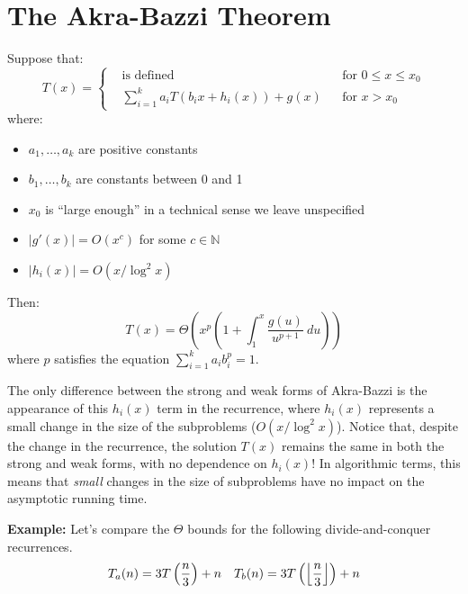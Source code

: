 \documentclass[12pt]{article}
\providecommand{\abs}[1]{\lvert#1\rvert}
\begin{document}



\section*{The Akra-Bazzi Theorem}

\begin{theorem}
Suppose that:
\[
T(x) =
\left\{
\begin{aligned}
& \text{is defined} && \text{for $0 \leq x \leq x_0$} \\
& {\displaystyle \sum_{i=1}^k a_i T(b_i x + h_i(x)) + g(x)} && \text{for $x > x_0$}
\end{aligned}
\right.
\]
%
where:
%
\begin{itemize}
\item $a_1, \dots, a_k$ are positive constants
\item $b_1, \dots, b_k$ are constants between 0 and 1
\item $x_0$ is ``large enough'' in a technical sense we leave unspecified
\item $\abs{g'(x)} = O(x^c)$ for some $c \in \mathbb{N}$
\item $\abs{h_i(x)} = O(x / \log^2 x)$
\end{itemize}
%
Then:
%
\[
T(x) = \Theta\left(x^p \left(1 + \int_1^x \frac{g(u)}{u^{p+1}} \ du\right)\right)
\]
%
where $p$ satisfies the equation $\sum_{i=1}^k a_i b_i^p = 1$.
\end{theorem}

The only difference between the strong and weak forms of Akra-Bazzi is the appearance of this $h_i(x)$ term in the recurrence, where $h_i(x)$ represents a small change in the size of the subproblems ($O(x / \log^2 x)$). Notice that, despite the change in the recurrence, the solution $T(x)$ remains the same in both the strong and weak forms, with no dependence on $h_i(x)$! In algorithmic terms, this means that \textit{small} changes in the size of subproblems have no
impact on the asymptotic running time.

\vspace{0.2in}

\noindent \textbf{Example:} Let's compare the $\Theta$ bounds for the following divide-and-conquer recurrences.
\begin{align*}
T_a(n) = 3T\left(\frac{n}{3}\right) + n && T_b(n) = 3T\left(\left\lfloor\frac{n}{3}\right\rfloor\right) + n
\end{align*}
\end{document}
